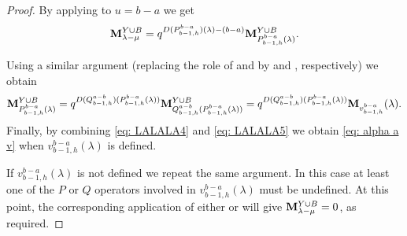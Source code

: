 \begin{proof}
By applying  to $u=b-a$ we get
\begin{equation} \label{eq: LALALA4}
    \mathbf{M}_{\lambda - \mu}^{Y\cup B} = q^{D(P_{b-1,h}^{b-a})(\lambda)- (b-a)} \mathbf{M}_{P_{b-1,h}^{b-a} (\lambda) }^{Y\cup B}.
\end{equation}


Using a similar argument (replacing the role of  and    by  and , respectively) we obtain 
\begin{equation} \label{eq: LALALA5}
     \mathbf{M}_{P_{b-1,h}^{b-a} (\lambda) }^{Y\cup B} = q^{D(Q^{a-b}_{b-1,h})(P_{b-1,h}^{b-a} (\lambda) ) }   \mathbf{M}_{ Q^{a-b}_{b-1,h}(P_{b-1,h}^{b-a}(\lambda))  }^{Y\cup B} = q^{D(Q^{a-b}_{b-1,h})(P_{b-1,h}^{b-a} (\lambda) ) } \mathbf{M}_{v^{b-a}_{b-1,h}}(\lambda). 
\end{equation}
 Finally, by combining \cref{eq: LALALA4} and \cref{eq: LALALA5} we obtain \cref{eq: alpha a v} when $v^{b-a}_{b-1,h}(\lambda)$ is defined. 

 If $v^{b-a}_{b-1,h}(\lambda)$ is not defined we repeat the same argument. 
 In this case at least one of the $P$ or $Q$ operators involved in $v^{b-a}_{b-1,h}(\lambda)$ must be undefined. 
 At this point, the corresponding application of either 
  or  will give $\mathbf{M}_{\lambda -\mu }^{Y\cup B}=0$, as required. 
\end{proof}



